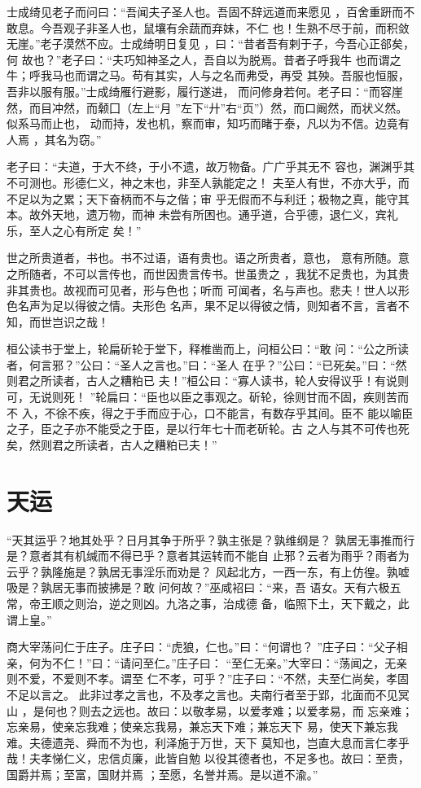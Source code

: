 \documentclass[12pt,UTF8]{ctexbook}
\begin{document}
士成绮见老子而问曰：“吾闻夫子圣人也。吾固不辞远道而来愿见 ，百舍重趼而不敢息。今吾观子非圣人也，鼠壤有余蔬而弃妹，不仁 也！生熟不尽于前，而积敛无崖。”老子漠然不应。士成绮明日复见 ，曰：“昔者吾有剌于子，今吾心正郤矣，何 故也？”老子曰：“夫巧知神圣之人，吾自以为脱焉。昔者子呼我牛 也而谓之牛；呼我马也而谓之马。苟有其实，人与之名而弗受，再受 其殃。吾服也恒服，吾非以服有服。”士成绮雁行避影，履行遂进， 而问修身若何。老子曰：“而容崖然，而目冲然，而颡囗（左上“月 ”左下“廾”右“页”）然，而口阚然，而状义然。似系马而止也， 动而持，发也机，察而审，知巧而睹于泰，凡以为不信。边竟有人焉 ，其名为窃。”

老子曰：“夫道，于大不终，于小不遗，故万物备。广广乎其无不 容也，渊渊乎其不可测也。形德仁义，神之末也，非至人孰能定之！ 夫至人有世，不亦大乎，而不足以为之累；天下奋柄而不与之偕；审 乎无假而不与利迁；极物之真，能守其本。故外天地，遗万物，而神 未尝有所困也。通乎道，合乎德，退仁义，宾礼乐，至人之心有所定 矣！”

世之所贵道者，书也。书不过语，语有贵也。语之所贵者，意也， 意有所随。意之所随者，不可以言传也，而世因贵言传书。世虽贵之 ，我犹不足贵也，为其贵非其贵也。故视而可见者，形与色也；听而 可闻者，名与声也。悲夫！世人以形色名声为足以得彼之情。夫形色 名声，果不足以得彼之情，则知者不言，言者不知，而世岂识之哉！

桓公读书于堂上，轮扁斫轮于堂下，释椎凿而上，问桓公曰：“敢 问：“公之所读者，何言邪？”公曰：“圣人之言也。”曰：“圣人 在乎？”公曰：“已死矣。”曰：“然则君之所读者，古人之糟粕已 夫！”桓公曰：“寡人读书，轮人安得议乎！有说则可，无说则死！ ”轮扁曰：“臣也以臣之事观之。斫轮，徐则甘而不固，疾则苦而不 入，不徐不疾，得之于手而应于心，口不能言，有数存乎其间。臣不 能以喻臣之子，臣之子亦不能受之于臣，是以行年七十而老斫轮。古 之人与其不可传也死矣，然则君之所读者，古人之糟粕已夫！”

\section{天运}

“天其运乎？地其处乎？日月其争于所乎？孰主张是？孰维纲是？ 孰居无事推而行是？意者其有机缄而不得已乎？意者其运转而不能自 止邪？云者为雨乎？雨者为云乎？孰隆施是？孰居无事淫乐而劝是？ 风起北方，一西一东，有上仿徨。孰嘘吸是？孰居无事而披拂是？敢 问何故？”巫咸袑曰：“来，吾 语女。天有六极五常，帝王顺之则治，逆之则凶。九洛之事，治成德 备，临照下土，天下戴之，此谓上皇。”

商大宰荡问仁于庄子。庄子曰：“虎狼，仁也。”曰：“何谓也？ ”庄子曰：“父子相亲，何为不仁！”曰：“请问至仁。”庄子曰： “至仁无亲。”大宰曰：“荡闻之，无亲则不爱，不爱则不孝。谓至 仁不孝，可乎？”庄子曰：“不然，夫至仁尚矣，孝固不足以言之。 此非过孝之言也，不及孝之言也。夫南行者至于郢，北面而不见冥山 ，是何也？则去之远也。故曰：以敬孝易，以爱孝难；以爱孝易，而 忘亲难；忘亲易，使亲忘我难；使亲忘我易，兼忘天下难；兼忘天下 易，使天下兼忘我难。夫德遗尧、舜而不为也，利泽施于万世，天下 莫知也，岂直大息而言仁孝乎哉！夫孝悌仁义，忠信贞廉，此皆自勉 以役其德者也，不足多也。故曰：至贵，国爵并焉；至富，国财并焉 ；至愿，名誉并焉。是以道不渝。”
\end{document}
